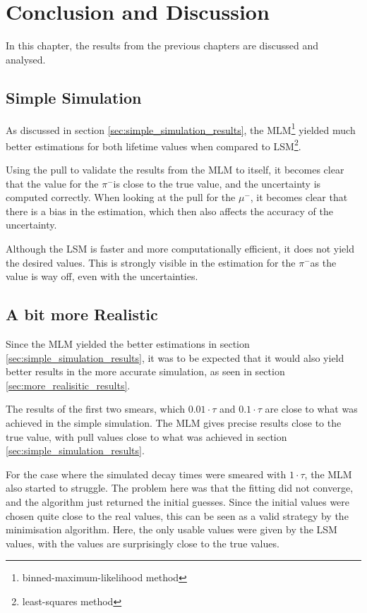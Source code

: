 \documentclass[11pt, a4paper, oneside]{book}
\newcommand{\pion}{$\pi^{-}$}
\newcommand{\muon}{$\mu^{-}$}
\begin{document}
\chapter{Conclusion and Discussion}

In this chapter, the results from the previous chapters are discussed and analysed.

\section{Simple Simulation}
As discussed in section \ref{sec:simple_simulation_results}, the MLM\footnote{binned-maximum-likelihood method} yielded much better estimations for both lifetime values when compared to LSM\footnote{least-squares method}. 

Using the pull to validate the results from the MLM to itself, it becomes clear that the value for the \pion is close to the true value, and the uncertainty is computed correctly. When looking at the pull for the \muon, it becomes clear that there is a bias in the estimation, which then also affects the accuracy of the uncertainty. 

Although the LSM is faster and more computationally efficient, it does not yield the desired values. This is strongly visible in the estimation for the \pion as the value is way off, even with the uncertainties. 

\section{A bit more Realistic}
Since the MLM yielded the better estimations in section \ref{sec:simple_simulation_results}, it was to be expected that it would also yield better results in the more accurate simulation, as seen in section \ref{sec:more_realisitic_results}.

The results of the first two smears, which $0.01 \cdot \tau$ and $0.1 \cdot \tau$ are close to what was achieved in the simple simulation. The MLM gives precise results close to the true value, with pull values close to what was achieved in section \ref{sec:simple_simulation_results}. 

For the case where the simulated decay times were smeared with $1 \cdot \tau$, the MLM also started to struggle. The problem here was that the fitting did not converge, and the algorithm just returned the initial guesses. Since the initial values were chosen quite close to the real values, this can be seen as a valid strategy by the minimisation algorithm. Here, the only usable values were given by the LSM values, with the values are surprisingly close to the true values.  
\end{document}
